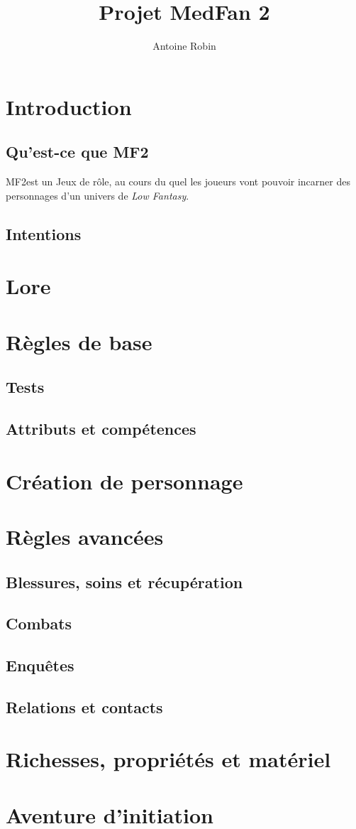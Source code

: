 \documentclass[10pt,a4paper]{book}
\author{ Antoine Robin}
\title{Projet MedFan 2}
\newcommand{\titre}{MF2}
\begin{document}
\maketitle
\tableofcontents
\chapter*{Introduction}
\section*{Qu'est-ce que \titre}
\titre est un Jeux de rôle, au cours du quel les joueurs vont pouvoir incarner des personnages d'un univers de \emph{Low Fantasy}. 
\section*{Intentions}

\chapter{Lore}
\chapter{Règles de base}
\section{Tests}

\section{Attributs et compétences}
\chapter{Création de personnage}
\chapter{Règles avancées}
\section{Blessures, soins et récupération}
\section{Combats}
\section{Enquêtes}
\section{Relations et contacts}
\chapter{Richesses, propriétés et matériel}
\chapter{Aventure d'initiation}
\end{document}
